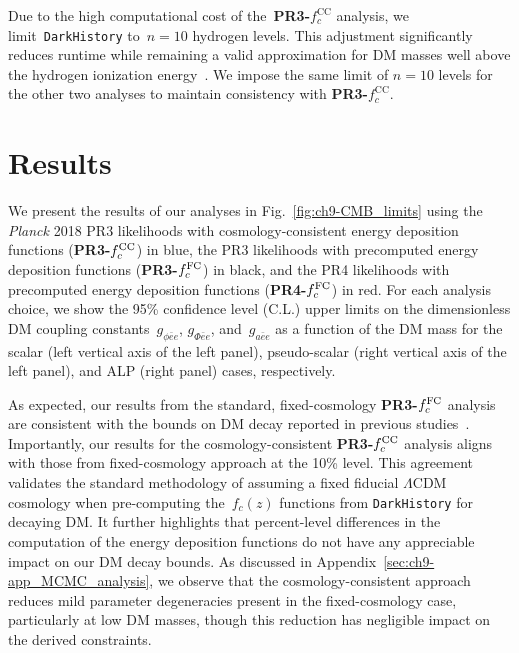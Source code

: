 Due to the high computational cost of the~\textbf{PR3-$f^\mathrm{CC}_c$} analysis, we limit~\texttt{DarkHistory} to~$n = 10$ hydrogen levels.
This adjustment significantly reduces runtime while remaining a valid approximation for DM masses well above the hydrogen ionization energy~\cite{Liu:2023fgu, Liu:2023nct}.
We impose the same limit of $n=10$ levels for the other two analyses to maintain consistency with \textbf{PR3-$f^\mathrm{CC}_c$}.



\section{Results}
\label{sec:ch9-results}

We present the results of our analyses in Fig.~\ref{fig:ch9-CMB_limits} using the \textit{Planck} 2018 PR3 likelihoods with cosmology-consistent energy deposition functions (\textbf{PR3-$f_c^{\rm{CC}}$}) in \textcolor{tabblue}{blue}, the PR3 likelihoods with precomputed energy deposition functions (\textbf{PR3-$f_c^{\rm{FC}}$}) in black, and the PR4 likelihoods with precomputed energy deposition functions (\textbf{PR4-$f_c^{\rm{FC}}$}) in \textcolor{tabred}{red}.
For each analysis choice, we show the 95\% confidence level (C.L.) upper limits on the dimensionless DM coupling constants~$g_{\phi \bar{e}e}$, $g_{\Phi \bar{e}e}$, and~$g_{a \bar{e}e}$ as a function of the DM mass for the scalar (left vertical axis of the left panel), pseudo-scalar (right vertical axis of the left panel), and ALP (right panel) cases, respectively.

As expected, our results from the standard, fixed-cosmology \textbf{PR3-$f_c^{\rm{FC}}$} analysis are consistent with the bounds on DM decay reported in previous studies~\cite{Capozzi:2023xie, Liu:2023nct, 2024arXiv240813305X}.
Importantly, our results for the cosmology-consistent \textbf{PR3-$f_c^{\rm{CC}}$} analysis aligns with those from fixed-cosmology approach at the 10\% level.
This agreement validates the standard methodology of assuming a fixed fiducial $\Lambda$CDM cosmology when pre-computing the~$f_c(z)$ functions from \texttt{DarkHistory} for decaying DM.
It further highlights that percent-level differences in the computation of the energy deposition functions do not have any appreciable impact on our DM decay bounds. As discussed in Appendix~\ref{sec:ch9-app_MCMC_analysis}, we observe that the cosmology-consistent approach reduces mild parameter degeneracies present in the fixed-cosmology case, particularly at low DM masses, though this reduction has negligible impact on the derived constraints.

